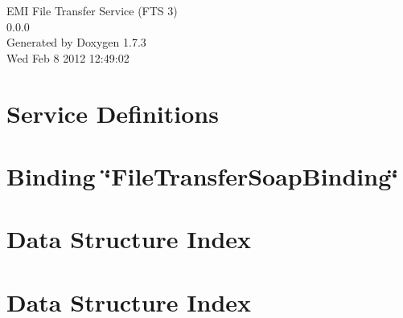 \documentclass[a4paper]{book}
\begin{document}
\begin{titlepage}
\vspace*{7cm}
\begin{center}
{\Large EMI File Transfer Service (FTS 3) \\[1ex]\large 0.0.0 }\\
\vspace*{1cm}
{\large Generated by Doxygen 1.7.3}\\
\vspace*{0.5cm}
{\small Wed Feb 8 2012 12:49:02}\\
\end{center}
\end{titlepage}
\clearemptydoublepage
{}
\tableofcontents
\clearemptydoublepage
{}
\chapter{Service Definitions}
\label{index}
\chapter{Binding \char`\"{}FileTransferSoapBinding\char`\"{}}
\label{FileTransferSoapBinding}

\chapter{Data Structure Index}

\chapter{Data Structure Index}

\end{document}
